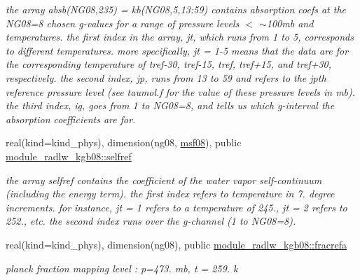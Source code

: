 \begin{DoxyCompactItemize}
\begin{DoxyCompactList}\small\item\em the array absb(\+N\+G08,235) = kb(\+N\+G08,5,13\+:59) contains absorption coefs at the N\+G08=8 chosen g-\/values for a range of pressure levels $<$ $\sim$100mb and temperatures. the first index in the array, jt, which runs from 1 to 5, corresponds to different temperatures. more specifically, jt = 1-\/5 means that the data are for the corresponding temperature of tref-\/30, tref-\/15, tref, tref+15, and tref+30, respectively. the second index, jp, runs from 13 to 59 and refers to the jpth reference pressure level (see taumol.\+f for the value of these pressure levels in mb). the third index, ig, goes from 1 to N\+G08=8, and tells us which g-\/interval the absorption coefficients are for. \end{DoxyCompactList}\item 
\mbox{\label{group__module__radlw__kgbnn_ga2c38561d26f86f7ae515b433843c4e5d}} 
real(kind=kind\+\_\+phys), dimension(ng08, \hyperlink{group__module__radlw__kgbnn_ga7db22d5a0ece1b1f10cbf64ae1181a09}{msf08}), public \hyperlink{group__module__radlw__kgbnn_ga2c38561d26f86f7ae515b433843c4e5d}{module\+\_\+radlw\+\_\+kgb08\+::selfref}
\begin{DoxyCompactList}\small\item\em the array selfref contains the coefficient of the water vapor self-\/continuum (including the energy term). the first index refers to temperature in 7. degree increments. for instance, jt = 1 refers to a temperature of 245., jt = 2 refers to 252., etc. the second index runs over the g-\/channel (1 to N\+G08=8). \end{DoxyCompactList}\item 
\mbox{\label{group__module__radlw__kgbnn_gad1a59ffb362cd72537df9c1916c07621}} 
real(kind=kind\+\_\+phys), dimension(ng08), public \hyperlink{group__module__radlw__kgbnn_gad1a59ffb362cd72537df9c1916c07621}{module\+\_\+radlw\+\_\+kgb08\+::fracrefa}
\begin{DoxyCompactList}\small\item\em planck fraction mapping level \+: p=473. mb, t = 259. k \end{DoxyCompactList}\item 
\mbox{\label{group__module__radlw__kgbnn_ga0ae7e4c01034a2b95c03b041537b962e}} 

\end{DoxyCompactItemize}
